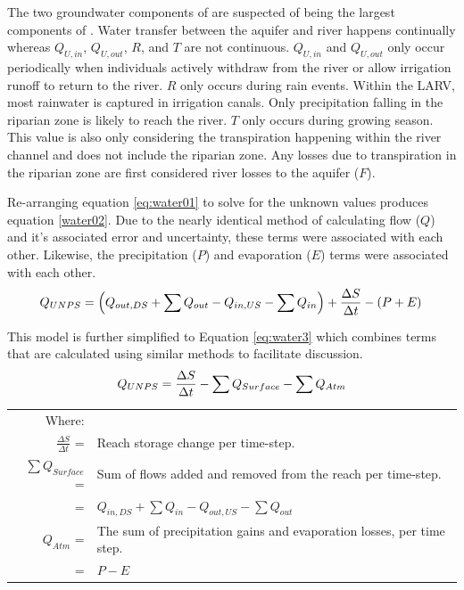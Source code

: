 The two groundwater components of \Qnps are suspected of being the largest components of \Qnps.  Water transfer between the aquifer and river happens continually whereas $ Q_{U,in} $, $ Q_{U,out} $, $ R $, and $ T $ are not continuous.  $ Q_{U,in} $ and $ Q_{U,out} $ only occur periodically when individuals actively withdraw from the river or allow irrigation runoff to return to the river.  $ R $ only occurs during rain events.  Within the LARV, most rainwater is captured in irrigation canals.  Only precipitation falling in the riparian zone is likely to reach the river.  $ T $ only occurs during growing season.  This value is also only considering the transpiration happening within the river channel and does not include the riparian zone.  Any losses due to transpiration in the riparian zone are first considered river losses to the aquifer ($ F $).

Re-arranging equation \eqref{eq:water01} to solve for the unknown values produces equation \ref{water02}.  Due to the nearly identical method of calculating flow ($ Q $) and it's associated error and uncertainty, these terms were associated with each other.  Likewise, the precipitation ($ P $) and evaporation ($ E $) terms were associated with each other.
\begin{equation}
	\label{eq:water2}
	Q_{UNPS} = \left( Q_{out,DS} + \sum Q_{out} - Q_{in,US} - \sum Q_{in} \right) + \frac{\Delta S}{\Delta t} - \left( P + E \right)\\ 
\end{equation}

This model is further simplified to Equation \ref{eq:water3} which combines terms that are calculated using similar methods to facilitate discussion.
\begin{equation}
	\label{eq:water3}
	Q_{UNPS} = \frac{\Delta S}{\Delta t} - \sum Q_{Surface} - \sum Q_{Atm}\\ 
\end{equation}
\begin{tabular}{r p{5.5in}}
	Where:&\\
	$ \displaystyle \frac{\Delta S}{\Delta t} $ = & Reach storage change per time-step.\\
	$ \displaystyle \sum Q_{Surface} $ = & Sum of flows added and removed from the reach per time-step. \\
		= & $ Q_{in,DS} + \sum Q_{in} - Q_{out,US} - \sum Q_{out} $\\
	$ Q_{Atm} $ = & The sum of precipitation gains and evaporation losses, per time step.\\
		= & $ P - E $\\
\end{tabular}\\

